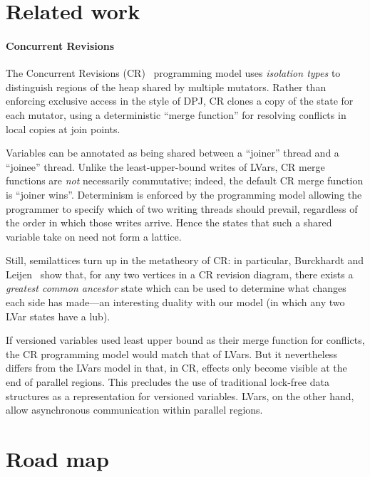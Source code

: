 \documentclass{article}
\begin{document}
\section{Related work}

\paragraph{Concurrent Revisions}

The Concurrent Revisions (CR)~\cite{concurrent-revisions-haskell11}
programming model uses \emph{isolation types} \cite{isolation-types}
to distinguish regions of the heap shared by multiple mutators.
Rather than enforcing exclusive access in the style of DPJ, CR clones
a copy of the state for each mutator, using a deterministic ``merge
function'' for resolving conflicts in local copies at join points.

Variables can be annotated as being shared between a ``joiner'' thread
and a ``joinee'' thread.  Unlike the least-upper-bound writes of
LVars, CR merge functions are \emph{not} necessarily commutative;
indeed, the default CR merge function is ``joiner wins''.  Determinism
is enforced by the programming model allowing the programmer to
specify which of two writing threads should prevail, regardless of the
order in which those writes arrive.  Hence the states that such a
shared variable take on need not form a lattice.

Still, semilattices turn up in the metatheory of CR: in particular,
Burckhardt and Leijen~\cite{semantics-concurrent-revisions} show that,
for any two vertices in a CR revision diagram, there exists a
\emph{greatest common ancestor} state which can be used to determine
what changes each side has made---an interesting duality with our
model (in which any two LVar states have a lub). 

If versioned variables used least upper bound as their merge function
for conflicts, the CR programming model would match that of LVars.    But it nevertheless
differs from the LVars model in that, in CR, effects only become
visible at the end of parallel regions. 
This precludes the use of traditional lock-free data structures as a
representation for versioned variables.  LVars, on the other hand,
allow asynchronous communication within parallel regions.

\section{Road map}



\end{document}
